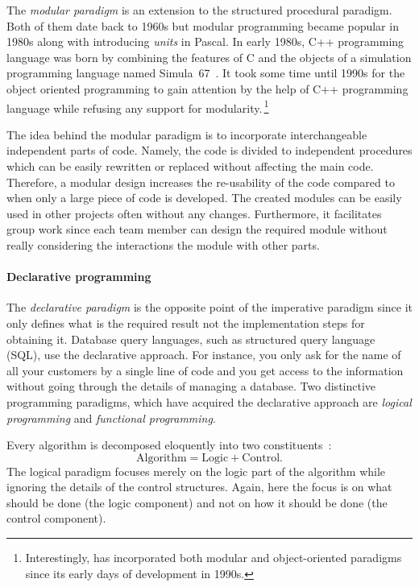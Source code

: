 	The \textit{modular paradigm} is an extension to the structured procedural paradigm. Both of them date back to 1960s but modular programming became popular in 1980s along with introducing \textit{units} in Pascal. In early 1980s, C++ programming language was born by combining the features of C and the objects of a simulation programming language named Simula~67~\autocite{Deitel.2006}. It took some time until 1990s for the object oriented programming to gain attention by the help of C++ programming language while refusing any support for modularity.\,\footnote{Interestingly, \py{} has incorporated both modular and object-oriented paradigms since its early days of development in 1990s.}
	
	The idea behind the modular paradigm is to incorporate interchangeable independent parts of code. Namely, the code is divided to independent procedures which can be easily rewritten or replaced without affecting the main code. Therefore, a modular design increases the re-usability of the code compared to when only a large piece of code is developed. The created modules can be easily used in other projects often without any changes. Furthermore, it facilitates group work since each team member can design the required module without really considering the interactions the module with other parts.
	
	\paragraph{Declarative programming} The \textit{declarative paradigm} is the opposite point of the imperative paradigm since it only defines what is the required result not the implementation steps for obtaining it. Database query languages, such as structured query language (SQL), use the declarative approach. For instance, you only ask for the name of all your customers by a single line of code and you get access to the information without going through the details of managing a database. Two distinctive programming paradigms, which have acquired the declarative approach are \textit{logical programming} and \textit{functional programming}.
	
	Every algorithm is decomposed eloquently into two constituents~\autocite{Kowalski.1979}:
	\begin{equation*}
	\text{Algorithm}=\text{Logic}+\text{Control}.
	\end{equation*}
	The logical paradigm focuses merely on the logic part of the algorithm while ignoring the details of the control structures. Again, here the focus is on what should be done (the logic component) and not on how it should be done (the control component).

